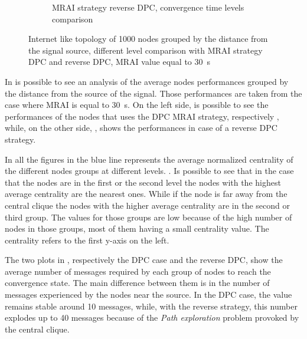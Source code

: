 \begin{figure}[h]
\begin{subfigure}[b]{0.45\textwidth}
		 \caption{\ac{MRAI} strategy reverse \ac{DPC}, convergence time levels comparison}
         \label{fig:different_levels_comparison_reverse_dpc_time}
     \end{subfigure}
     \hfill
	 \caption{Internet like topology of \num{1000} nodes grouped by the distance
	 from the signal source, different level comparison with \ac{MRAI} strategy
	 \ac{DPC} and reverse \ac{DPC}, \ac{MRAI} value equal to \SI{30}{\second}
	 }
	 \label{fig:different_levels_comparison}
\end{figure}

In  is possible to see an analysis of the
average nodes performances grouped by the distance from the source of the signal.
Those performances are taken from the case where \ac{MRAI} is equal to
\SI{30}{\second}.
On the left side, is possible to see the performances of the nodes that uses the
\ac{DPC} \ac{MRAI} strategy, respectively
,
while, on the other side, ,
shows the performances in case of a reverse \ac{DPC} strategy.

In all the figures in  the blue line
represents the average normalized centrality of the different nodes groups at different
levels. .
Is possible to see that in the case that the nodes are in the first or the
second level the nodes with the highest average centrality are the nearest ones.
While if the node is far away from the central clique the nodes with the
higher average centrality are in the second or third group.
The values for those groups are low because of the high number of nodes
in those groups, most of them having a small centrality value.
The centrality refers to the first y-axis on the left.

The two plots in ,
respectively the \ac{DPC} case and the reverse \ac{DPC},
show the average number of messages required by each group of nodes to reach
the convergence state.
The main difference between them is in the number of messages experienced by
the nodes near the source.
In the \ac{DPC} case, the value remains stable around \num{10} messages, while,
with the reverse strategy, this number explodes up to \num{40} messages because
of the \textit{Path exploration} problem provoked by the central clique.


